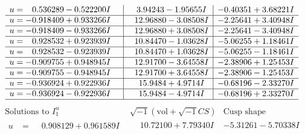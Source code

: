 \documentclass[1p]{elsarticle_modified}
\theoremstyle{definition}
\newcommand{\I}{\sqrt{-1}}
\begin{document}
$$\begin{array}{c|c|c}
\begin{aligned}
u &= \phantom{-}0.536289 - 0.522200 I\end{aligned}
 & \phantom{-}3.94243 - 1.95655 I & -0.40351 + 3.68221 I \\ \hline\begin{aligned}
u &= -0.918409 + 0.933266 I\end{aligned}
 & \phantom{-}12.96880 - 3.08508 I & -2.25641 + 3.40948 I \\ \hline\begin{aligned}
u &= -0.918409 - 0.933266 I\end{aligned}
 & \phantom{-}12.96880 + 3.08508 I & -2.25641 - 3.40948 I \\ \hline\begin{aligned}
u &= \phantom{-}0.928532 + 0.923939 I\end{aligned}
 & \phantom{-}10.84470 - 1.03628 I & -5.06255 + 1.18461 I \\ \hline\begin{aligned}
u &= \phantom{-}0.928532 - 0.923939 I\end{aligned}
 & \phantom{-}10.84470 + 1.03628 I & -5.06255 - 1.18461 I \\ \hline\begin{aligned}
u &= -0.909755 + 0.948945 I\end{aligned}
 & \phantom{-}12.91700 - 3.64558 I & -2.38906 + 1.25453 I \\ \hline\begin{aligned}
u &= -0.909755 - 0.948945 I\end{aligned}
 & \phantom{-}12.91700 + 3.64558 I & -2.38906 - 1.25453 I \\ \hline\begin{aligned}
u &= -0.936924 + 0.922936 I\end{aligned}
 & \phantom{-}15.9484 + 4.9714 I & -0.68196 - 2.33270 I \\ \hline\begin{aligned}
u &= -0.936924 - 0.922936 I\end{aligned}
 & \phantom{-}15.9484 - 4.9714 I & -0.68196 + 2.33270 I\\
 \hline 
 \end{array}$$\newpage$$\begin{array}{c|c|c}  
\text{Solutions to }I^u_{1}& \I (\text{vol} + \sqrt{-1}CS) & \text{Cusp shape}\\
 \hline 
\begin{aligned}
u &= \phantom{-}0.908129 + 0.961589 I\end{aligned}
 & \phantom{-}10.72100 + 7.79340 I & -5.31261 - 5.70338 I \\ \hline\begin{aligned}

\end{aligned}
\end{array}$$
\end{document}
